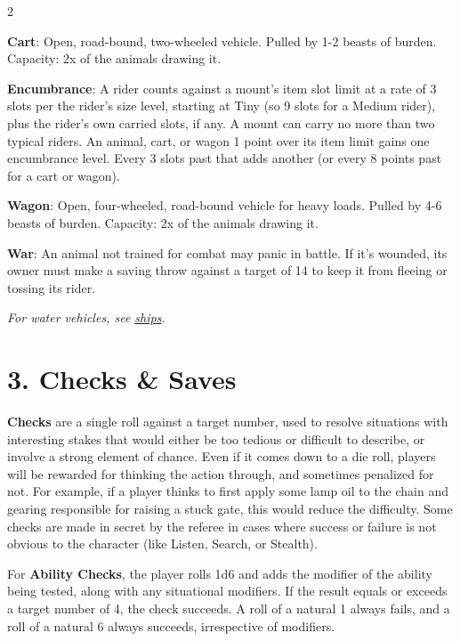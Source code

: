 \documentclass{book}
\begin{document}
\begin{multicols}{2}

\footnotesize{
	\textbf{Cart}: Open, road-bound, two-wheeled vehicle. Pulled by 1-2
	beasts of burden. Capacity: 2x of the animals drawing it.
	
	\textbf{Encumbrance}: A rider counts against a mount's item slot limit
	at a rate of 3 slots per the rider's size level, starting at Tiny (so 9
	slots for a Medium rider), plus the rider's own carried slots, if any. A
	mount can carry no more than two typical riders. An animal, cart, or
	wagon 1 point over its item limit gains one encumbrance level. Every 3
	slots past that adds another (or every 8 points past for a cart or
	wagon).
	
	\textbf{Wagon}: Open, four-wheeled, road-bound vehicle for heavy loads.
	Pulled by 4-6 beasts of burden. Capacity: 2x of the animals drawing it.
	
	\textbf{War}: An animal not trained for combat may panic in battle. If
	it's wounded, its owner must make a saving throw against a target of 14
	to keep it from fleeing or tossing its rider.
	
	\emph{For water vehicles, see \hyperref[ships]{ships}.}
}

\end{multicols}

\newpage

\section*{3. Checks \& Saves}\label{checks-saves}

\textbf{Checks} are a single roll against a target number, used to
resolve situations with interesting stakes that would either be too
tedious or difficult to describe, or involve a strong element of chance.
Even if it comes down to a die roll, players will be rewarded for
thinking the action through, and sometimes penalized for not. For
example, if a player thinks to first apply some lamp oil to the chain
and gearing responsible for raising a stuck gate, this would reduce the
difficulty. Some checks are made in secret by the referee in cases where
success or failure is not obvious to the character (like Listen, Search,
or Stealth).

\bigskip

For \textbf{Ability Checks}, the player rolls 1d6 and adds the modifier
of the ability being tested, along with any situational modifiers. If
the result equals or exceeds a target number of 4, the check succeeds. A
roll of a natural 1 always fails, and a roll of a natural 6 always
succeeds, irrespective of modifiers.
\end{document}
